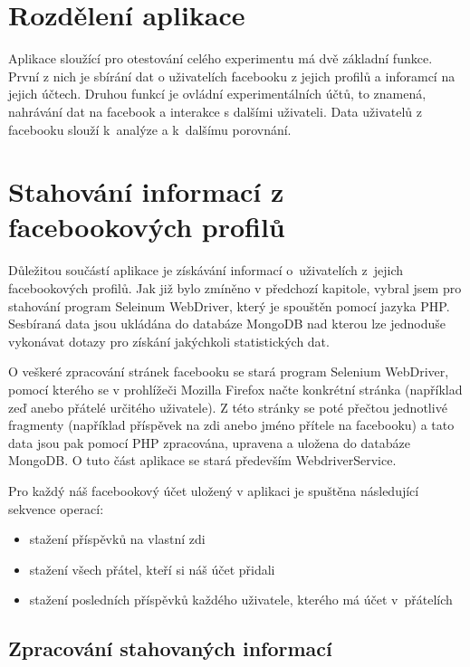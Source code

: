 \documentclass[thesis=M,czech]{FITthesis}[2013/05/10]
\begin{document}
\section{Rozdělení aplikace}

Aplikace sloužící pro otestování celého experimentu má dvě základní funkce. První z nich je sbírání dat o uživatelích facebooku z jejich profilů a inforamcí na jejich účtech. Druhou funkcí je ovládní experimentálních účtů, to znamená, nahrávání dat na facebook a interakce s dalšími uživateli. Data uživatelů z facebooku slouží k~analýze a k~dalšímu porovnání.

\section{Stahování informací z facebookových profilů}

Důležitou součástí aplikace je získávání informací o~uživatelích z~jejich facebookových profilů. Jak již bylo zmíněno v předchozí kapitole, vybral jsem pro stahování program Seleinum WebDriver, který je spouštěn pomocí jazyka PHP. Sesbíraná data jsou ukládána do databáze MongoDB nad kterou lze jednoduše vykonávat dotazy pro získání jakýchkoli statistických dat.

O veškeré zpracování stránek facebooku se stará program Selenium WebDriver, pomocí kterého se v prohlížeči Mozilla Firefox načte konkrétní stránka (například zeď anebo přátelé určitého uživatele). Z této stránky se poté přečtou jednotlivé fragmenty (například příspěvek na zdi anebo jméno přítele na facebooku) a tato data jsou pak pomocí PHP zpracována, upravena a uložena do databáze MongoDB. O tuto část aplikace se stará především WebdriverService.

Pro každý náš facebookový účet uložený v aplikaci je spuštěna následující sekvence operací:

\begin{itemize}
  \item stažení příspěvků na vlastní zdi
  \item stažení všech přátel, kteří si náš účet přidali
  \item stažení posledních příspěvků každého uživatele, kterého má účet v~přátelích
\end{itemize}

\subsection{Zpracování stahovaných informací}
\end{document}
